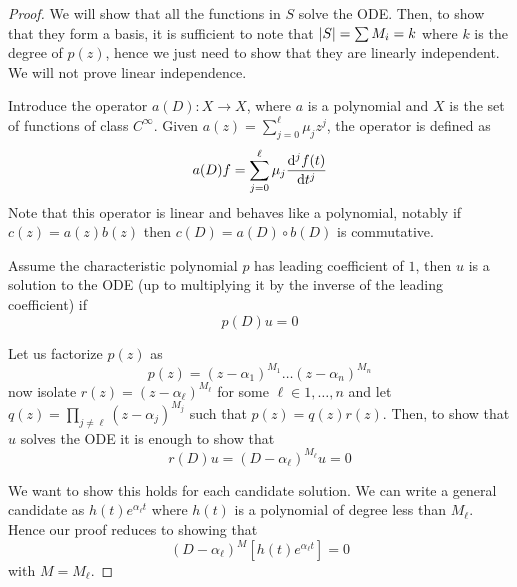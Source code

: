 \documentclass[12pt]{extarticle}
\numberwithin{equation}{section}
\begin{document}
\begin{proof}
	We will show that all the functions in $S$ solve the ODE.
	Then, to show that they form a basis, it is sufficient to note that
	$\abs{S} = \sum M_i = k$ where $k$ is the degree of $p(z)$,
	hence we just need to show that they are linearly independent.
	We will not prove linear independence.

	Introduce the operator $a(D) : X \to X$, where $a$ is a polynomial and
	$X$ is the set of functions of class $C^\infty$.
	Given $a(z) = \sum_{j= 0}^\ell \mu_j z^j$, the operator is defined as
	\begin{equation}
		a(D)f = \sum^{\ell}_{j = 0} \mu_j \dv[j]{f(t)}{t}
	\end{equation}
	Note that this operator is linear and behaves like a polynomial,
	notably if $c(z) = a(z)b(z)$ then $c(D) = a(D) \circ b(D)$ is commutative.

	Assume the characteristic polynomial $p$ has leading coefficient of $1$,
	then $u$ is a solution to the ODE (up to multiplying it by the inverse of the leading coefficient) if
	\begin{equation}
		p(D)u = 0
	\end{equation}

	Let us factorize $p(z)$ as
	\begin{equation}
		p(z) = (z-\alpha_1)^{M_1} \dots (z-\alpha_n)^{M_n}
	\end{equation}
	now isolate $r(z) = (z-\alpha_\ell)^{M_\ell}$ for some $\ell \in 1, \dots, n$
	and let $q(z) = \prod_{j \neq \ell} (z-\alpha_j)^{M_j}$
	such that $p(z) = q(z)r(z)$.
	Then, to show that $u$ solves the ODE it is enough to show that
	\begin{equation}
		r(D)u = (D - \alpha_\ell)^{M_\ell}u = 0
	\end{equation}

	We want to show this holds for each candidate solution.
	We can write a general candidate as $h(t) e^{\alpha_\ell t}$
	where $h(t)$ is a polynomial of degree less than $M_\ell$.
	Hence our proof reduces to showing that
	\begin{equation}
		(D - \alpha_\ell)^{M} [h(t) e^{\alpha_\ell t}] = 0
	\end{equation}
	with $M = M_\ell$.


\end{proof}
\end{document}

